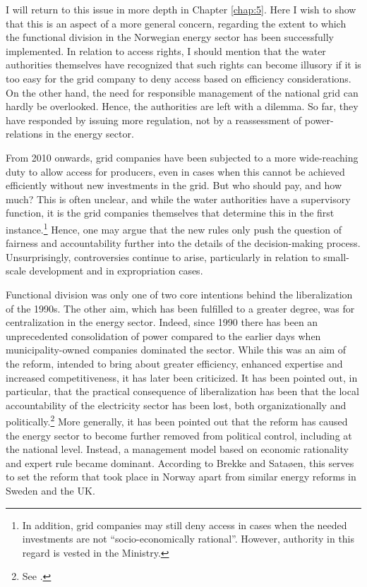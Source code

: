 I will return to this issue in more depth in Chapter \ref{chap:5}. Here I wish to show that this is an aspect of a more general concern, regarding the extent to which the functional division in the Norwegian energy sector has been successfully implemented. In relation to access rights, I should mention that the water authorities themselves have recognized that such rights can become illusory if it is too easy for the grid company to deny access based on efficiency considerations. On the other hand, the need for responsible management of the national grid can hardly be overlooked. Hence, the authorities are left with a dilemma. So far, they have responded by issuing more regulation, not by a reassessment of power-relations in the energy sector.

From 2010 onwards, grid companies have been subjected to a more wide-reaching duty to allow access for producers, even in cases when this cannot be achieved efficiently without new investments in the grid. But who should pay, and how much? This is often unclear, and while the water authorities have a supervisory function, it is the grid companies themselves that determine this in the first instance.\footnote{In addition, grid companies may still deny access in cases when the needed investments are not ``socio-economically rational''. However, authority in this regard is vested in the Ministry.} Hence, one may argue that the new rules only push the question of fairness and accountability further into the details of the decision-making process. Unsurprisingly, controversies continue to arise, particularly in relation to small-scale development and in expropriation cases.

Functional division was only one of two core intentions behind the liberalization of the 1990s. The other aim, which has been fulfilled to a greater degree, was for centralization in the energy sector. Indeed, since 1990 there has been an unprecedented consolidation of power compared to the earlier days when municipality-owned companies dominated the sector. While this was an aim of the reform, intended to bring about greater efficiency, enhanced expertise and increased competitiveness, it has later been criticized. It has been pointed out, in particular, that the practical consequence of liberalization has been that the local accountability of the electricity sector has been lost, both organizationally and politically.\footnote{See \cite{agnell11}.} More generally, it has been pointed out that the reform has caused the energy sector to become further removed from political control, including at the national level. Instead, a management model based on economic rationality and expert rule became dominant. According to Brekke and Sataøen, this serves to set the reform that took place in Norway apart from similar energy reforms in Sweden and the UK. 

